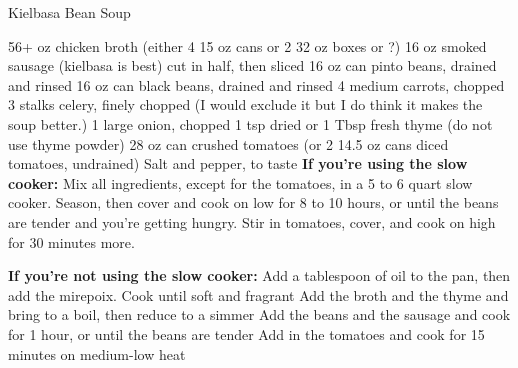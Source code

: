 \documentclass[../cookbook.tex]{subfiles}
\begin{document}
\begin{recipe}{Kielbasa Bean Soup}


\ingredients
	{56+ oz chicken broth (either 4 15 oz cans or 2 32 oz boxes or ?)}
	{16 oz smoked sausage (kielbasa is best) cut in half, then sliced}
	{16 oz can pinto beans, drained and rinsed}
	{16 oz can black beans, drained and rinsed}
	{4 medium carrots, chopped}
	{3 stalks celery, finely chopped (I would exclude it but I do think it makes the soup better.)}
	{1 large onion, chopped}
	{1 tsp dried or 1 Tbsp fresh thyme (do not use thyme powder)}
	{28 oz can crushed tomatoes (or 2 14.5 oz cans diced tomatoes, undrained)}
	{Salt and pepper, to taste}
\stopingredients
\textbf{If you're using the slow cooker:} \bigbreak
\preparation
	{Mix all ingredients, except for the tomatoes, in a 5 to 6 quart slow cooker. 
	Season, then cover and cook on low for 8 to 10 hours, or until the beans are
	tender and you're getting hungry.}
	{Stir in tomatoes, cover, and cook on high for 30 minutes more.}
\stopprep
\vspace{2em}

\textbf{If you're not using the slow cooker:} \bigbreak
\preparation
	{Add a tablespoon of oil to the pan, then add the mirepoix. Cook until soft
	and fragrant}
	{Add the broth and the thyme and bring to a boil, then reduce to a simmer}
    {Add the beans and the sausage and cook for 1 hour, or until the beans are
	tender}
	{Add in the tomatoes and cook for 15 minutes on medium-low heat}
\stopprep
\end{recipe}
\end{document}
